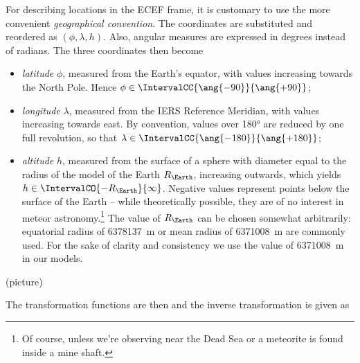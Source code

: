         For describing locations in the ECEF frame, it is customary to use the
        more convenient \emph{geographical convention}. The coordinates are substituted
        and reordered as $(\phi, \lambda, h)$.
        Also, angular measures are expressed in degrees instead of radians.
        The three coordinates then become
        \begin{itemize}
            \item \emph{latitude} $\phi$,
                measured from the Earth's equator, with values increasing towards the North Pole.
                Hence $\phi \in \IntervalCC{\ang{-90}}{\ang{+90}}$;
            \item \emph{longitude} $\lambda$, measured from the IERS Reference Meridian,
                with values increasing towards east. By convention, values over \ang{180} are
                reduced by one full revolution, so that $\lambda \in \IntervalCC{\ang{-180}}{\ang{+180}}$;
            \item \emph{altitude} $h$, measured from the surface of a sphere
                with diameter equal to the radius of the model of the Earth $R_\Earth$, increasing outwards,
                which yields $h \in \IntervalCO{-R_\Earth}{\infty}$.
                Negative values represent points below the surface of the Earth --
                while theoretically possible, they are of no interest in meteor
                astronomy.\footnote{Of course, unless we're observing near the Dead Sea
                or a meteorite is found inside a mine shaft.}
                The value of $R_\Earth$ can be chosen somewhat arbitrarily:
                equatorial radius of \SI{6378137}{\metre} or mean radius of \SI{6371008}{\metre} are commonly used.
                For the sake of clarity and consistency we use the value of \SI{6371008}{\metre} in our models.
        \end{itemize}

        (picture)

        The transformation functions are then
        and the inverse transformation is given as


